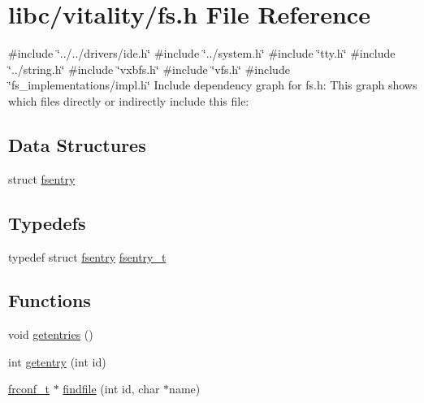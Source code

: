 \hypertarget{a00152}{}\section{libc/vitality/fs.h File Reference}
\label{a00152}
{\ttfamily \#include \char`\"{}../../drivers/ide.\+h\char`\"{}}\newline
{\ttfamily \#include \char`\"{}../system.\+h\char`\"{}}\newline
{\ttfamily \#include \char`\"{}tty.\+h\char`\"{}}\newline
{\ttfamily \#include \char`\"{}../string.\+h\char`\"{}}\newline
{\ttfamily \#include \char`\"{}vxbfs.\+h\char`\"{}}\newline
{\ttfamily \#include \char`\"{}vfs.\+h\char`\"{}}\newline
{\ttfamily \#include \char`\"{}fs\+\_\+implementations/impl.\+h\char`\"{}}\newline
Include dependency graph for fs.\+h\+:
This graph shows which files directly or indirectly include this file\+:
\subsection*{Data Structures}
\begin{DoxyCompactItemize}
\item 
struct \hyperlink{a00272}{fsentry}
\end{DoxyCompactItemize}
\subsection*{Typedefs}
\begin{DoxyCompactItemize}
\item 
typedef struct \hyperlink{a00272}{fsentry} \hyperlink{a00152_a9ccf6560e8aebea3e4402a31e8c0f46b_a9ccf6560e8aebea3e4402a31e8c0f46b}{fsentry\+\_\+t}
\end{DoxyCompactItemize}
\subsection*{Functions}
\begin{DoxyCompactItemize}
\item 
void \hyperlink{a00152_a414110036132977c34813673360e1a63_a414110036132977c34813673360e1a63}{getentries} ()
\item 
int \hyperlink{a00152_a3fb32d07d3bd05144a196c94fc59c0d1_a3fb32d07d3bd05144a196c94fc59c0d1}{getentry} (int id)
\item 
\hyperlink{a00191_a752f1bef3c13b98d682fddc44a9e47c8_a752f1bef3c13b98d682fddc44a9e47c8}{frconf\+\_\+t} $\ast$ \hyperlink{a00152_a5c15724e6f3ef2c0df67ccedfc8639eb_a5c15724e6f3ef2c0df67ccedfc8639eb}{findfile} (int id, char $\ast$name)
\end{DoxyCompactItemize}
